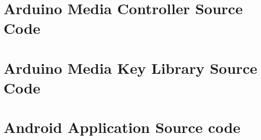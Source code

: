 \documentclass{article}
\begin{document}
	\begin{appendices}

		\section{Arduino Media Controller Source Code}
			
			
		\newpage
			
		\section{Arduino Media Key Library Source Code} \label{mediacpp}
			
		
			\newpage
			
			
			
		\newpage
			
		\section{Android Application Source code}
			
			
			\newpage
			
			
			

\end{appendices}
\end{document}
